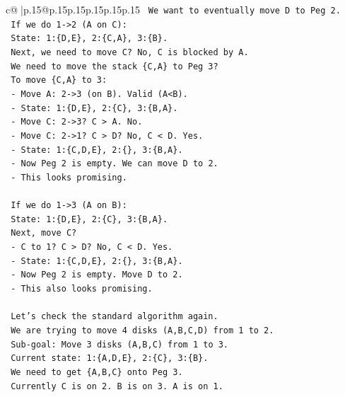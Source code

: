 \documentclass{article}
\begin{document}
{\begin{supertabular}{c@{$\;$}|p{.15\linewidth}@{}p{.15\linewidth}p{.15\linewidth}p{.15\linewidth}p{.15\linewidth}p{.15\linewidth}}
{{{\texttt{        We want to eventually move D to Peg 2.} \\
\texttt{        If we do 1{-}>2 (A on C):} \\
\texttt{          State: 1:\{D,E\}, 2:\{C,A\}, 3:\{B\}.} \\
\texttt{          Next, we need to move C? No, C is blocked by A.} \\
\texttt{          We need to move the stack \{C,A\} to Peg 3?} \\
\texttt{          To move \{C,A\} to 3:} \\
\texttt{            {-} Move A: 2{-}>3 (on B). Valid (A<B).} \\
\texttt{            {-} State: 1:\{D,E\}, 2:\{C\}, 3:\{B,A\}.} \\
\texttt{            {-} Move C: 2{-}>3? C > A. No.} \\
\texttt{            {-} Move C: 2{-}>1? C > D? No, C < D. Yes.} \\
\texttt{            {-} State: 1:\{C,D,E\}, 2:\{\}, 3:\{B,A\}.} \\
\texttt{            {-} Now Peg 2 is empty. We can move D to 2.} \\
\texttt{            {-} This looks promising.} \\
\\ 
\texttt{        If we do 1{-}>3 (A on B):} \\
\texttt{          State: 1:\{D,E\}, 2:\{C\}, 3:\{B,A\}.} \\
\texttt{          Next, move C?} \\
\texttt{          {-} C to 1? C > D? No, C < D. Yes.} \\
\texttt{          {-} State: 1:\{C,D,E\}, 2:\{\}, 3:\{B,A\}.} \\
\texttt{          {-} Now Peg 2 is empty. Move D to 2.} \\
\texttt{          {-} This also looks promising.} \\
\\ 
\texttt{        Let's check the standard algorithm again.} \\
\texttt{        We are trying to move 4 disks (A,B,C,D) from 1 to 2.} \\
\texttt{        Sub{-}goal: Move 3 disks (A,B,C) from 1 to 3.} \\
\texttt{        Current state: 1:\{A,D,E\}, 2:\{C\}, 3:\{B\}.} \\
\texttt{        We need to get \{A,B,C\} onto Peg 3.} \\
\texttt{        Currently C is on 2. B is on 3. A is on 1.} \\
}}}
\end{supertabular}}
\end{document}
